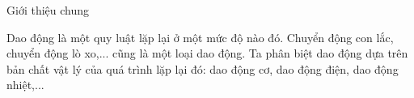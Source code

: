 \begin{frame}{Giới thiệu chung}

Dao động là một quy luật lặp lại ở một mức độ nào đó. Chuyển động con lắc, chuyển động lò xo,... cũng là một loại dao động. Ta phân biệt dao động dựa trên bản chất vật lý của quá trình lặp lại đó: dao động cơ, dao động điện, dao động nhiệt,... 

\begin{center}
    \scalebox{0.8}{  }
\end{center}



\end{frame}